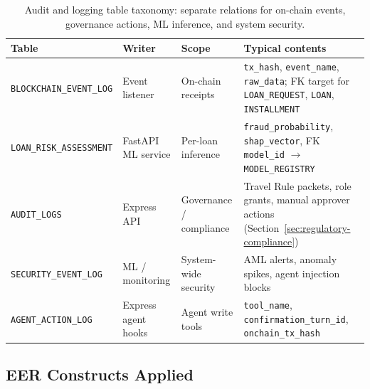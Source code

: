 \documentclass[12pt,a4paper]{report}
\newcommand{\tableheadcolor}{\rowcolor{TableHeadBg}}
\newcommand{\tableheadfont}{\bfseries}
\begin{document}
\begin{table}[H]
\centering
\small
\setlength{\tabcolsep}{4pt}
\renewcommand{\arraystretch}{1.12}
\caption[Audit and logging table taxonomy]{Audit and logging table taxonomy: separate relations for on-chain events, governance actions, ML inference, and system security.}
\label{tab:db-audit-taxonomy}
\begin{tabular}{@{}>{\raggedright\arraybackslash}p{3.4cm}>{\raggedright\arraybackslash}p{2.2cm}>{\raggedright\arraybackslash}p{3.2cm}>{\raggedright\arraybackslash}p{4.7cm}@{}}
\toprule
\tableheadcolor
\tableheadfont Table &
\tableheadfont Writer &
\tableheadfont Scope &
\tableheadfont Typical contents \\
\midrule
\texttt{BLOCKCHAIN\_EVENT\_LOG} &
  Event listener &
  On-chain receipts &
  \texttt{tx\_hash}, \texttt{event\_name}, \texttt{raw\_data}; FK target for \texttt{LOAN\_REQUEST}, \texttt{LOAN}, \texttt{INSTALLMENT} \\
\rowcolor{RowShade}
\texttt{LOAN\_RISK\_ASSESSMENT} &
  FastAPI ML service &
  Per-loan inference &
  \texttt{fraud\_probability}, \texttt{shap\_vector}, FK \texttt{model\_id} $\to$ \texttt{MODEL\_REGISTRY} \\
\texttt{AUDIT\_LOGS} &
  Express API &
  Governance / compliance &
  Travel Rule packets, role grants, manual approver actions (Section~\ref{sec:regulatory-compliance}) \\
\rowcolor{RowShade}
\texttt{SECURITY\_EVENT\_LOG} &
  ML / monitoring &
  System-wide security &
  AML alerts, anomaly spikes, agent injection blocks \\
\texttt{AGENT\_ACTION\_LOG} &
  Express agent hooks &
  Agent write tools &
  \texttt{tool\_name}, \texttt{confirmation\_turn\_id}, \texttt{onchain\_tx\_hash} \\
\bottomrule
\end{tabular}
\end{table}

\subsection{EER Constructs Applied}
\end{document}
